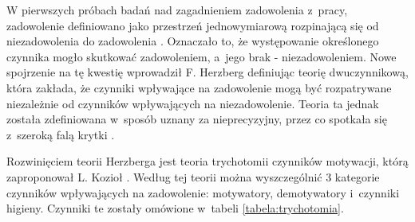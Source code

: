 W pierwszych próbach badań nad zagadnieniem zadowolenia z~pracy, zadowolenie definiowano jako przestrzeń jednowymiarową rozpinającą się od niezadowolenia do zadowolenia \cite{sowinska-2014}.
Oznaczało to, że występowanie określonego czynnika mogło skutkować zadowoleniem, a~jego brak - niezadowoleniem.
Nowe spojrzenie na tę kwestię wprowadził F. Herzberg definiując teorię dwuczynnikową,
która zakłada, że czynniki wpływające na zadowolenie mogą być rozpatrywane niezależnie od czynników wpływających na niezadowolenie.
Teoria ta jednak została zdefiniowana w~sposób uznany za nieprecyzyjny, przez co spotkała się z~szeroką falą krytki \cite{sowinska-2014}.

Rozwinięciem teorii Herzberga jest teoria trychotomii czynników motywacji, którą zaproponował L. Kozioł \cite{koziol-2011}.
Według tej teorii można wyszczególnić 3 kategorie czynników wpływających na zadowolenie: motywatory, demotywatory i~czynniki higieny.
Czynniki te zostały omówione w~tabeli \ref{tabela:trychotomia}.


